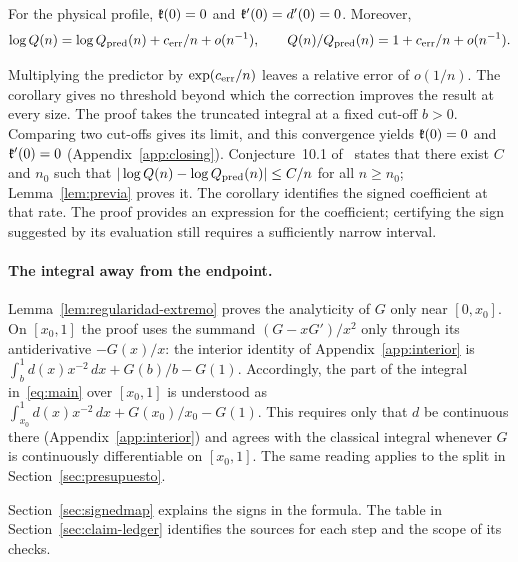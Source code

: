\begin{corolario}\label{cor:derivada}
For the physical profile, $\mathfrak{k}(0)=0$ and $\mathfrak{k}'(0)=d'(0)=0$. Moreover,
\[
 \log Q(n)=\log Q_{\rm pred}(n)+c_{\mathrm{err}}/n+o(n^{-1}),\qquad
 Q(n)/Q_{\rm pred}(n)=1+c_{\mathrm{err}}/n+o(n^{-1}).
\]
\end{corolario}
Multiplying the predictor by \(\exp(c_{\mathrm{err}}/n)\) leaves a relative error of \(o(1/n)\). The corollary gives
no threshold beyond which the correction improves the result at every size. The proof takes the truncated
integral at a fixed cut-off $b>0$. Comparing two cut-offs gives its limit, and this convergence yields
$\mathfrak{k}(0)=0$ and $\mathfrak{k}'(0)=0$ (Appendix~\ref{app:closing}). Conjecture~10.1 of~\cite{pc} states that
there exist $C$ and $n_0$ such that $|\log Q(n)-\log Q_{\rm pred}(n)|\le C/n$ for all $n\ge n_0$;
Lemma~\ref{lem:previa} proves it. The corollary identifies the signed coefficient at that rate. The
proof provides an expression for the coefficient; certifying the sign suggested by its evaluation still
requires a sufficiently narrow interval.

\paragraph{The integral away from the endpoint.} Lemma~\ref{lem:regularidad-extremo} proves the
analyticity of $G$ only near $[0,x_0]$. On $[x_0,1]$ the proof uses the summand $(G-xG')/x^2$ only
through its antiderivative $-G(x)/x$: the interior identity of Appendix~\ref{app:interior} is
$\int_b^1d(x)x^{-2}\,dx+G(b)/b-G(1)$. Accordingly, the part of the integral in~\eqref{eq:main} over
$[x_0,1]$ is understood as $\int_{x_0}^1d(x)x^{-2}\,dx+G(x_0)/x_0-G(1)$. This requires only that $d$ be
continuous there (Appendix~\ref{app:interior}) and agrees with the classical integral whenever $G$ is
continuously differentiable on $[x_0,1]$. The same reading applies to the split in
Section~\ref{sec:presupuesto}.

Section~\ref{sec:signedmap} explains the signs in the formula. The table in
Section~\ref{sec:claim-ledger} identifies the sources for each step and the scope of its checks.
